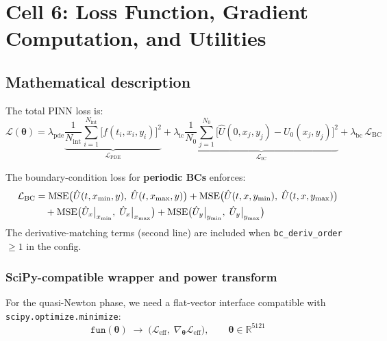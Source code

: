 \documentclass[11pt,a4paper]{article}
\begin{document}
\section{Cell 6: Loss Function, Gradient Computation, and Utilities}
\label{sec:loss}

\subsection*{Mathematical description}

The total PINN loss is:
\begin{equation}
\boxed{
  \mathcal{L}(\bm\theta)
  = \lambda_{\mathrm{pde}}
    \underbrace{
      \frac{1}{N_{\mathrm{int}}} \sum_{i=1}^{N_{\mathrm{int}}}
      \bigl[f(t_i,x_i,y_i)\bigr]^2
    }_{\mathcal{L}_{\mathrm{PDE}}}
  + \lambda_{\mathrm{ic}}
    \underbrace{
      \frac{1}{N_0} \sum_{j=1}^{N_0}
      \bigl[\hat{U}(0,x_j,y_j) - U_0(x_j,y_j)\bigr]^2
    }_{\mathcal{L}_{\mathrm{IC}}}
  + \lambda_{\mathrm{bc}}\,\mathcal{L}_{\mathrm{BC}}
}
\label{eq:loss}
\end{equation}

The boundary-condition loss for \textbf{periodic BCs} enforces:
\begin{align}
  \mathcal{L}_{\mathrm{BC}} &=
    \mathrm{MSE}\bigl(\hat{U}(t,x_{\min},y),\;\hat{U}(t,x_{\max},y)\bigr)
    + \mathrm{MSE}\bigl(\hat{U}(t,x,y_{\min}),\;\hat{U}(t,x,y_{\max})\bigr)
    \notag\\
    &\quad + \mathrm{MSE}\bigl(\hat{U}_x\big|_{x_{\min}},\;
                               \hat{U}_x\big|_{x_{\max}}\bigr)
    + \mathrm{MSE}\bigl(\hat{U}_y\big|_{y_{\min}},\;
                               \hat{U}_y\big|_{y_{\max}}\bigr)
\label{eq:bc_loss}
\end{align}
The derivative-matching terms (second line) are included when
\texttt{bc\_deriv\_order} $ \ge 1$ in the config.

\subsubsection*{SciPy-compatible wrapper and power transform}

For the quasi-Newton phase, we need a flat-vector interface compatible
with \texttt{scipy.optimize.minimize}:
\[
  \texttt{fun}(\bm\theta) \;\to\;
  \bigl(\mathcal{L}_{\mathrm{eff}},\;
        \nabla_{\bm\theta}\mathcal{L}_{\mathrm{eff}}\bigr),
  \qquad \bm\theta \in \mathbb{R}^{5121}
\]
\end{document}
